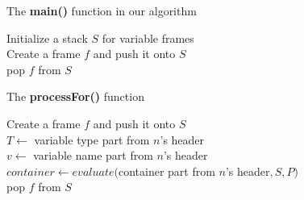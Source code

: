 \begin{minipage}{.4\linewidth}
\footnotesize
\begin{algorithm}[H]
\caption{The \textbf{main()} function in our algorithm}\label{alg:main}
Initialize a stack $S$ for variable frames\\
Create a frame $f$ and push it onto $S$\\
pop $f$ from $S$
\end{algorithm}
\begin{algorithm}[H]
\caption{The \textbf{processFor()} function}\label{alg:process_for}
Create a frame $f$ and push it onto $S$\\
$T \leftarrow$ variable type part from $n$'s header\\
$v \leftarrow$ variable name part from $n$'s header\\
$container \leftarrow evaluate($container part from $n$'s header$, S, P)$\\
pop $f$ from $S$
\end{algorithm}
\end{minipage}
\hfill
